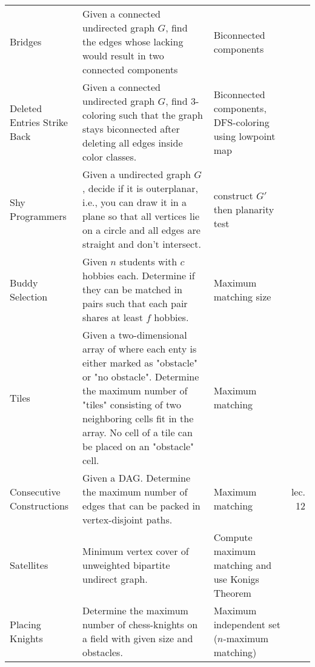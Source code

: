 \documentclass[a4paper, 10pt]{article}
\begin{document}
\begin{longtable}{ L{2cm} L{8cm} L{4cm} r}
        Bridges 
        & Given a connected undirected graph $G$, find the edges whose lacking would result in two connected components         
        & Biconnected components &  \pageref{sec:bridges} \\

        Deleted Entries Strike Back 
        & Given a connected undirected graph $G$, find 3-coloring such that the graph stays biconnected after deleting all edges inside color classes.         
        & Biconnected components, DFS-coloring using lowpoint map &  \pageref{sec:deleted_entries_strike_back} \\


        Shy Programmers 
        & Given a undirected graph $G$, decide if it is outerplanar, i.e., you can draw it in a plane so that all vertices lie on a 
            circle and all edges are straight and don't intersect.
        & construct $G'$ then planarity test &  \pageref{sec:shy_programmers} \\

        Buddy Selection
        & Given $n$ students with $c$ hobbies each. Determine if they can be matched in pairs such that each pair shares at least $f$ hobbies.
        & Maximum matching size &  \pageref{sec:buddy_selection} \\

        Tiles 
        & Given a two-dimensional array of where each enty is either marked as "obstacle" or "no obstacle". 
            Determine the maximum number of "tiles" consisting of two neighboring cells fit in the array. 
            No cell of a tile can be placed on an "obstacle" cell. 
            & Maximum matching &  \pageref{sec:tiles} \\

        Consecutive Constructions 
        & Given a DAG. 
        Determine the maximum number of edges that can be packed in vertex-disjoint paths.            
        & Maximum matching &  lec. 12 \\


        Satellites 
        & Minimum vertex cover of unweighted bipartite undirect graph. 
        & Compute maximum matching and use Konigs Theorem &  \pageref{sec:satellites} \\

        Placing Knights 
        & Determine the maximum number of chess-knights on a field with given size and obstacles.
        & Maximum independent set ($n$-maximum matching) &  \pageref{sec:placing_knights} \\


\end{longtable}
\end{document}
